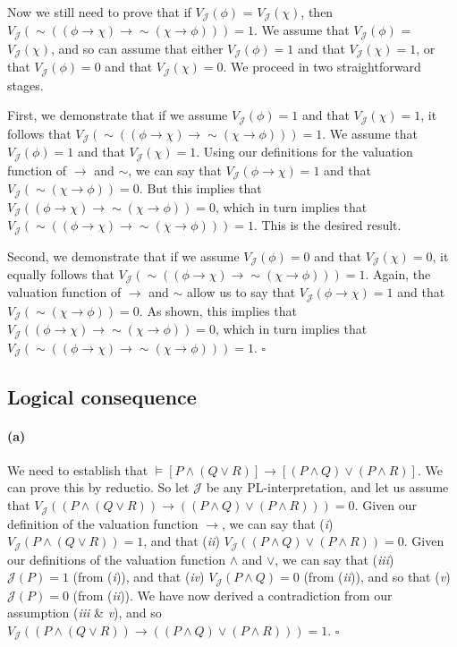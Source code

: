 \documentclass[sloppy, journal, git, bytitle]{humapap}
\begin{document}
Now we still need to prove that if $V\mathcal{_J}(\phi)$ = $V\mathcal{_J}(\chi)$, then $V\mathcal{_J}(\sim((\phi\rightarrow\chi)\rightarrow\sim(\chi\rightarrow\phi)))=1$. We assume that $V\mathcal{_J}(\phi)$ = $V\mathcal{_J}(\chi)$, and so can assume that either $V\mathcal{_J}(\phi)=1$ and that $V\mathcal{_J}(\chi)=1$, or that $V\mathcal{_J}(\phi)=0$ and that $V\mathcal{_J}(\chi)=0$. We proceed in two straightforward stages.  

First, we demonstrate that if we assume $V\mathcal{_J}(\phi)=1$ and that $V\mathcal{_J}(\chi)=1$, it follows that $V\mathcal{_J}(\sim((\phi\rightarrow\chi)\rightarrow\sim(\chi\rightarrow\phi)))=1$. We assume that $V\mathcal{_J}(\phi)=1$ and that $V\mathcal{_J}(\chi)=1$. Using our definitions for the valuation function of $\rightarrow$ and $\sim$, we can say that $V\mathcal{_J}(\phi\rightarrow\chi)=1$ and that $V\mathcal{_J}(\sim(\chi\rightarrow\phi))=0$. But this implies that $V\mathcal{_J}((\phi\rightarrow\chi)\rightarrow\sim(\chi\rightarrow\phi))=0$, which in turn implies that $V\mathcal{_J}(\sim((\phi\rightarrow\chi)\rightarrow\sim(\chi\rightarrow\phi)))=1$. This is the desired result. 

Second, we demonstrate that if we assume $V\mathcal{_J}(\phi)=0$ and that $V\mathcal{_J}(\chi)=0$, it equally follows that $V\mathcal{_J}(\sim((\phi\rightarrow\chi)\rightarrow\sim(\chi\rightarrow\phi)))=1$. Again, the valuation function of $\rightarrow$ and $\sim$ allow us to say that $V\mathcal{_J}(\phi\rightarrow\chi)=1$ and that $V\mathcal{_J}(\sim(\chi\rightarrow\phi))=0$. As shown, this implies that $V\mathcal{_J}((\phi\rightarrow\chi)\rightarrow\sim(\chi\rightarrow\phi))=0$, which in turn implies that $V\mathcal{_J}(\sim((\phi\rightarrow\chi)\rightarrow\sim(\chi\rightarrow\phi)))=1$. $\square$

\subsection{Logical consequence}

\paragraph{(a)} We need to establish that $\vDash[P\wedge (Q\vee R)]\rightarrow[(P\wedge Q)\vee(P\wedge R)]$. 
We can prove this by reductio. 
So let $\mathcal{J}$ be any PL-interpretation, and let us assume that 
$V\mathcal{_J}((P\wedge (Q\vee R))\rightarrow((P\wedge Q)\vee(P\wedge R)))=0$. 
Given our definition of the valuation function $\rightarrow$, we can say that 
(\emph{i}) $V\mathcal{_J}(P\wedge (Q\vee R))=1$, and that
(\emph{ii}) $V\mathcal{_J}((P\wedge Q)\vee(P\wedge R))=0$.
Given our definitions of the valuation function $\wedge$ and $\vee$, we can say that 
(\emph{iii}) $\mathcal{J}(P)=1$ (from (\emph{i})), and that 
(\emph{iv}) $V\mathcal{_J}(P\wedge Q)=0$ (from (\emph{ii})), and so that 
(\emph{v}) $\mathcal{J}(P)=0$ (from (\emph{ii})). 
We have now derived a contradiction from our assumption (\emph{iii} \& \emph{v}), 
and so $V\mathcal{_J}((P\wedge (Q\vee R))\rightarrow((P\wedge Q)\vee(P\wedge R)))=1$. $\square$
\end{document}
